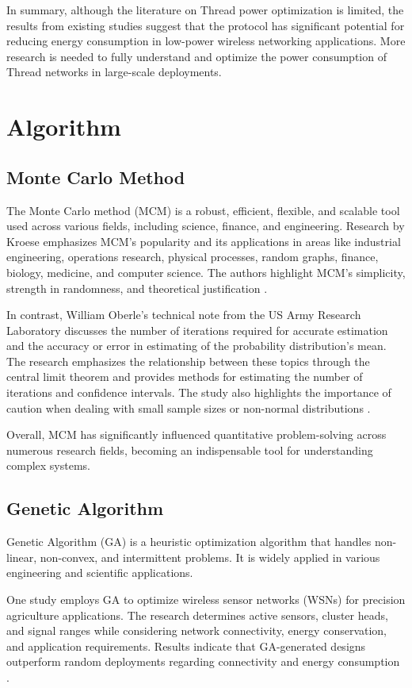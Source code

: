 In summary, although the literature on Thread power optimization is limited, the results from existing studies suggest that the protocol has significant potential for reducing energy consumption in low-power wireless networking applications. More research is needed to fully understand and optimize the power consumption of Thread networks in large-scale deployments.


\section{Algorithm}\label{sec:algorithm_research}
\subsection{Monte Carlo Method}
The Monte Carlo method (MCM) is a robust, efficient, flexible, and scalable tool used across various fields, including science, finance, and engineering. Research by Kroese emphasizes MCM's popularity and its applications in areas like industrial engineering, operations research, physical processes, random graphs, finance, biology, medicine, and computer science. The authors highlight MCM's simplicity, strength in randomness, and theoretical justification \cite{kroese2014monte}.

In contrast, William Oberle's technical note from the US Army Research Laboratory discusses the number of iterations required for accurate estimation and the accuracy or error in estimating of the probability distribution's mean. The research emphasizes the relationship between these topics through the central limit theorem and provides methods for estimating the number of iterations and confidence intervals. The study also highlights the importance of caution when dealing with small sample sizes or non-normal distributions \cite{oberle2015monte}.

Overall, MCM has significantly influenced quantitative problem-solving across numerous research fields, becoming an indispensable tool for understanding complex systems.

\subsection{Genetic Algorithm}
Genetic Algorithm (GA) is a heuristic optimization algorithm that handles non-linear, non-convex, and intermittent problems. It is widely applied in various engineering and scientific applications.

One study employs GA to optimize wireless sensor networks (WSNs) for precision agriculture applications. The research determines active sensors, cluster heads, and signal ranges while considering network connectivity, energy conservation, and application requirements. Results indicate that GA-generated designs outperform random deployments regarding connectivity and energy consumption \cite{ferentinos2005energy}.

